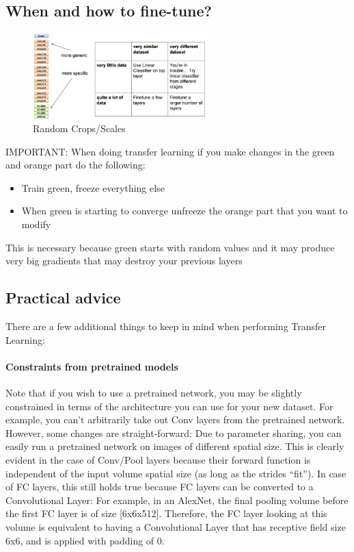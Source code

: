 \subsection*{When and how to fine-tune?}
\begin{figure}[!htb]
  \centering
  \includegraphics[width=0.6\textwidth]{Images/data_aug_trans/4.png}
  \caption{Random Crops/Scales}
\end{figure}
IMPORTANT: When doing transfer learning if you make changes in the green and orange part do the following:
\begin{itemize}
\item Train green, freeze everything else
\item When green is starting to converge unfreeze the orange part that you want to modify
\end{itemize}

This is necessary because green starts with random values and it may produce very big gradients that may destroy your previous layers

\subsection*{Practical advice}
There are a few additional things to keep in mind when performing Transfer Learning:

\paragraph*{Constraints from pretrained models} Note that if you wish to use a pretrained network, you may be slightly constrained in terms of the architecture you can use for your new dataset. For example, you can’t arbitrarily take out Conv layers from the pretrained network. However, some changes are straight-forward: Due to parameter sharing, you can easily run a pretrained network on images of different spatial size. This is clearly evident in the case of Conv/Pool layers because their forward function is independent of the input volume spatial size (as long as the strides “fit”). In case of FC layers, this still holds true because FC layers can be converted to a Convolutional Layer: For example, in an AlexNet, the final pooling volume before the first FC layer is of size [6x6x512]. Therefore, the FC layer looking at this volume is equivalent to having a Convolutional Layer that has receptive field size 6x6, and is applied with padding of 0.

